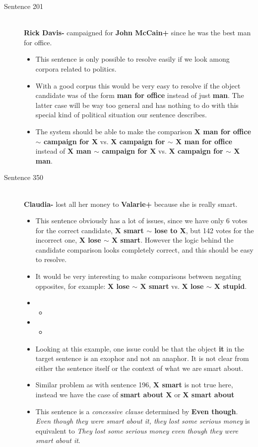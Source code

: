 \documentclass{scrartcl}
\newcommand{\insertcode}[2]{\begin{itemize}\item[]\end{itemize}} %
\begin{document}
\begin{description}
  \item[Sentence 201] \hfill \\
  {\bf Rick Davis-} campaigned for {\bf John McCain+} since he was the best man for office.
  \begin{itemize}
  	\item This sentence is only possible to resolve easily if we look among corpora related to politics.
  	\item With a good corpus this would be very easy to resolve if the object candidate was of the form {\bf man for office} instead of just {\bf man}. The latter case will be way too general and has nothing to do with this special kind of political situation our sentence describes.
  	\item The system should be able to make the comparison {\bf X man for office $\sim$ campaign for X} vs. {\bf X campaign for $\sim$ X man for office} instead of {\bf X man $\sim$ campaign for X} vs. {\bf X campaign for $\sim$ X man}. 
  \end{itemize}

  \item[Sentence 350] \hfill \\
  {\bf Claudia-} lost all her money to {\bf Valarie+} because she is really smart.
  \begin{itemize}
  	\item This sentence obviously has a lot of issues, since we have only 6 votes for the correct candidate, {\bf X smart $\sim$ lose to X}, but 142 votes for the incorrect one, {\bf X lose $\sim$ X smart}. However the logic behind the candidate comparison looks completely correct, and this should be easy to resolve.
  	\item It would be very interesting to make comparisons between negating opposites, for example: {\bf X lose $\sim$ X smart} vs. {\bf X lose $\sim$ X stupid}.
  	\item \insertcode{"Scripts/350/350-1.sentence"}{Context from $R_1$ and $R_2$.}
  	\item \insertcode{"Scripts/350/350-2.sentence"}{Target sentence for $R_1$ and $R_2$.}
  	\item Looking at this example, one issue could be that the object {\bf it} in the target sentence is an exophor and not an anaphor. It is not clear from either the sentence itself or the context of what we are smart about. 
  	\item Similar problem as with sentence 196, {\bf X smart} is not true here, instead we have the case of {\bf smart about X} or {\bf X smart about}
  	\item This sentence is a {\it concessive clause} determined by {\bf Even though}. {\it Even though they were smart about it, they lost some serious money} is equivalent to {\it They lost some serious money even though they were smart about it}.
  \end{itemize}


\end{description}
\end{document}
